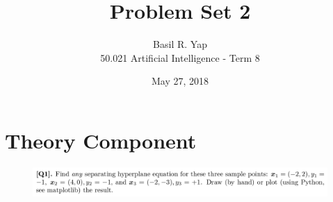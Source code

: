 \documentclass[12pt]{article}
\begin{document}
 
 
\title{Problem Set 2}%
\author{Basil R. Yap\\ %
50.021 Artificial Intelligence - Term 8} %
\date{May 27, 2018}
\maketitle

\section{Theory Component}
\begin{figure}[h!]
\includegraphics[width=\linewidth]{./assets/201805292051.png}
\end{figure}
\end{document}
